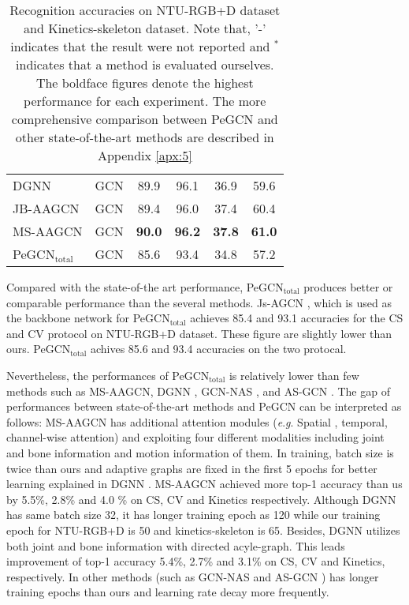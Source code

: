 \documentclass[runningheads]{llncs}
\newcommand{\eg}{\textit{e}.\textit{g}. }
\begin{document}
\begin{wraptable}{r}{60mm}
{\begin{tabular}{l c c c c c }
     	\multicolumn{1}{l}{DGNN \cite{shi2019skeleton}} & GCN & 89.9  & 96.1 & 36.9 & 59.6 \\
		\multicolumn{1}{l}{JB-AAGCN \cite{shi2019multi}} &GCN & 89.4  & 96.0  & 37.4 & 60.4  \\
		\multicolumn{1}{l}{MS-AAGCN \cite{shi2019multi}} &GCN & \textbf{90.0}  & \textbf{96.2 } & \textbf{37.8} & \textbf{61.0}  \\
	    \midrule
		\multicolumn{1}{l}{PeGCN$_{\text{total}}$} & GCN & 85.6 &  93.4 &  34.8 &	57.2 \\
		\midrule
		\bottomrule
	\end{tabular}
    }
	\caption{Recognition accuracies on NTU-RGB+D dataset and Kinetics-skeleton dataset. Note that, '-' indicates that the result were not reported and $^{*}$ indicates that a method is evaluated ourselves. The boldface figures denote the highest performance for each experiment. The more comprehensive comparison between PeGCN and other state-of-the-art methods are described in Appendix \ref{apx:5}}
	\label{tab:normal}
	\vspace{-4ex}
\end{wraptable}

Compared with the state-of-the art performance, PeGCN$_{\text{total}}$ produces better or comparable performance than the several methods. Js-AGCN \cite{shi2019two}, which is used as the backbone network for PeGCN$_{\text{total}}$ achieves 85.4 and 93.1 accuracies for the CS and CV protocol on NTU-RGB+D dataset. These figure are slightly lower than ours. PeGCN$_{\text{total}}$ achives 85.6 and 93.4 accuracies on the two protocal. 


Nevertheless, the performances of PeGCN$_{\text{total}}$ is relatively lower than few methods such as MS-AAGCN\cite{shi2019multi}, DGNN \cite{shi2019skeleton}, GCN-NAS \cite{peng2019learning}, and AS-GCN \cite{li2019actional}.  The gap of performances between state-of-the-art methods and PeGCN can be interpreted as follows: MS-AAGCN\cite{shi2019multi} has additional attention modules (\eg Spatial , temporal, channel-wise attention) and exploiting four different modalities including joint and bone information and motion information of them. In training, batch size is twice than ours and adaptive graphs are fixed in the first 5 epochs for better learning explained in DGNN \cite{shi2019skeleton}. MS-AAGCN  achieved more top-1 accuracy than us by 5.5\%, 2.8\% and 4.0 \%  on CS, CV and Kinetics respectively. Although DGNN \cite{shi2019skeleton} has same batch size 32, it has longer training epoch as 120 while our training epoch for NTU-RGB+D is 50 and kinetics-skeleton is 65. Besides, DGNN utilizes both joint and bone information with directed acyle-graph. This leads improvement of top-1 accuracy 5.4\%, 2.7\% and 3.1\% on CS, CV and Kinetics, respectively. In other methods (such as GCN-NAS \cite{peng2019learning} and AS-GCN \cite{li2019actional}) has longer training epochs than ours and learning rate decay more frequently. 
\end{document}
